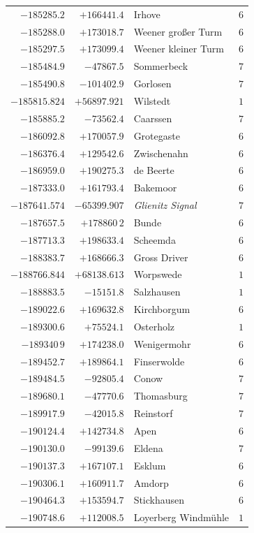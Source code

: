 \begin{center}
\begin{tabular}{r|r|p{170pt}|r}
\(-185285.2\)&\(+166441.4\)&Irhove&\(6\)\\
\(-185288.0\)&\(+173018.7\)&Weener großer Turm&\(6\)\\
\(-185297.5\)&\(+173099.4\)&Weener kleiner Turm&\(6\)\\
\(-185484.9\)&\(-47867.5\)&Sommerbeck&\(7\)\\
\(-185490.8\)&\(-101402.9\)&Gorlosen&\(7\)\\
\(-185815.824\)&\(+56897.921\)&Wilstedt&\(1\)\\
\(-185885.2\)&\(-73562.4\)&Caarssen&\(7\)\\
\(-186092.8\)&\(+170057.9\)&Grotegaste&\(6\)\\
\(-186376.4\)&\(+129542.6\)&Zwischenahn&\(6\)\\
\(-186959.0\)&\(+190275.3\)&de Beerte&\(6\)\\
\(-187333.0\)&\(+161793.4\)&Bakemoor&\(6\)\\
\(-187641.574\)&\(-65399.907\)&\textit{Glienitz Signal}&\(7\)\\
\(-187657.5\)&\(+178860\,2\)&Bunde&\(6\)\\
\(-187713.3\)&\(+198633.4\)&Scheemda&\(6\)\\
\(-188383.7\)&\(+168666.3\)&Gross Driver&\(6\)\\
\(-188766.844\)&\(+68138.613\)&Worpswede&\(1\)\\
\(-188883.5\)&\(-15151.8\)&Salzhausen&\(1\)\\
\(-189022.6\)&\(+169632.8\)&Kirchborgum&\(6\)\\
\(-189300.6\)&\(+75524.1\)&Osterholz&\(1\)\\
\(-189340\,9\)&\(+174238.0\)&Wenigermohr&\(6\)\\
\(-189452.7\)&\(+189864.1\)&Finserwolde&\(6\)\\
\(-189484.5\)&\(-92805.4\)&Conow&\(7\)\\
\(-189680.1\)&\(-47770.6\)&Thomasburg&\(7\)\\
\(-189917.9\)&\(-42015.8\)&Reinstorf&\(7\)\\
\(-190124.4\)&\(+142734.8\)&Apen&\(6\)\\
\(-190130.0\)&\(-99139.6\)&Eldena&\(7\)\\
\(-190137.3\)&\(+167107.1\)&Esklum&\(6\)\\
\(-190306.1\)&\(+160911.7\)&Amdorp&\(6\)\\
\(-190464.3\)&\(+153594.7\)&Stickhausen&\(6\)\\
\(-190748.6\)&\(+112008.5\)&Loyerberg Windmühle&\(1\)\\
\hline\end{tabular}\endgroup\end{center}
